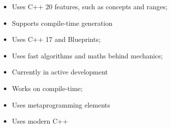 








\begin{itemize}
\item Uses C++ 20 features, such as concepts and ranges;
\item Supports compile-time generation
\end{itemize}
\begin{itemize}
\item Uses C++ 17 and Blueprints;
\item Uses fast algorithms and maths behind mechanics;
\item Currently in active development
\end{itemize}
\begin{itemize}
\item Works on compile-time;
\item Uses metaprogramming elements
\end{itemize}
\begin{itemize}
\item Uses modern C++
\end{itemize}